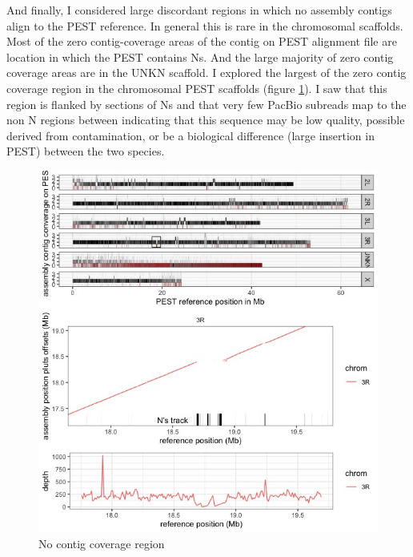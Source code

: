 \par{
And finally, I considered large discordant regions in which no assembly contigs align to the PEST reference. In general this is rare in the chromosomal scaffolds. Most of the zero contig-coverage areas of the contig on PEST alignment file are location in which the PEST contains Ns. And the large majority of zero contig coverage areas are in the UNKN scaffold. I explored the largest of the zero contig coverage region in the chromosomal PEST scaffolds (figure \ref{figure:nocovplot}). I saw that this region is flanked by sections of Ns and that very few PacBio subreads map to the non N regions between indicating that this sequence may be low quality, possible derived from contamination, or be a biological difference (large insertion in PEST) between the two species.
}

\begin{figure}[htbp!]

\caption{No contig coverage region}
\label{figure:nocovplot}
\begin{centering}
\includegraphics[width=1.0\textwidth]{Nocovplot.jpeg}
\end{centering}
\end{figure}



